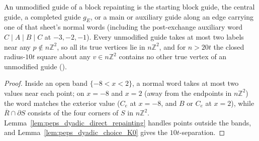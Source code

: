 \begin{lemma}
    An unmodified guide of a block repainting is the starting block guide, the
    central guide, a completed guide $g_E$, or a main or auxiliary guide along an
    edge carrying one of that sheet's normal words (including the post-exchange
    auxiliary word $C\mid A\mid B\mid C$ at $-3,-2,-1$). Every unmodified guide
    takes at most two labels near any $p\notin n\mathbb Z^2$, so all its true
    vertices lie in $n\mathbb Z^2$, and for $n>20t$ the closed radius-$10t$ square
    about any $v\in n\mathbb Z^2$ contains no other true vertex of an unmodified
    guide (\cite[Section~7, lines 321--326, 341--343]{OpenAI2026PolynomialPEPS}).
\end{lemma}

\begin{proof}\leanok
    Inside an open band $\{-8<x<2\}$, a normal word takes at most two values near
    each point; on $x=-8$ and $x=2$ (away from the endpoints in $n\mathbb Z^2$)
    the word matches the exterior value ($C_e$ at $x=-8$, and $B$ or $C_e$ at
    $x=2$), while $\overline R\cap\partial S$ consists of the four corners of $S$
    in $n\mathbb Z^2$. Lemma~\ref{lem:peps_dyadic_direct_repainting} handles
    points outside the bands, and Lemma~\ref{lem:peps_dyadic_choice_K0} gives the
    $10t$-separation.
\end{proof}


